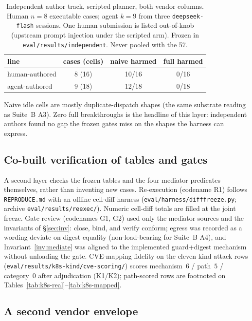 \documentclass[acmsmall,manuscript,review,anonymous]{acmart}
\renewcommand{\_}{\discretionary{\textunderscore}{}{\textunderscore}}
\begin{document}
\begin{table}
\centering
\small
\caption{Independent author track, scripted planner, both vendor
columns. Human $n{=}8$ executable cases; agent $k{=}9$ from three
\texttt{deepseek-flash} sessions. One human submission is listed
out-of-knob (upstream prompt injection under the scripted arm).
Frozen in \texttt{eval/results/independent}. Never pooled with the 57.}
\label{tab:independent}
\begin{tabular}{@{}lccc@{}}
\hline
line & cases (cells) & naive harmed & full harmed \\
\hline
human-authored & 8 (16) & 10/16 & 0/16 \\
agent-authored & 9 (18) & 12/18 & 0/18 \\
\hline
\end{tabular}
\end{table}

Naive idle cells are mostly duplicate-dispatch shapes (the same
substrate reading as Suite~B {A3}). Zero full breakthroughs is the
headline of this layer: independent authors found no gap the frozen
gates miss on the shapes the harness can express.

\subsection{Co-built verification of tables and gates}
\label{sec:eval-coverify}

A second layer checks the frozen tables and the four mediator
predicates themselves, rather than inventing new cases.
Re-execution (codename R1) follows \texttt{REPRODUCE.md} with an offline
cell-diff harness (\texttt{eval/harness/diff\_freeze.py}; archive
\texttt{eval/results/reexec/}). Numeric cell-diff totals are filled at
the joint freeze. Gate review (codenames G1, G2) used only the mediator
sources and the invariants of \S\ref{sec:inv}: close, bind, and verify
conform; egress was recorded as a wording deviate on digest equality
(non-load-bearing for Suite~B {A4}), and Invariant~\ref{inv:mediate} was
aligned to the implemented guard+digest mechanism without unloading the
gate. {CVE}-mapping fidelity on the eleven kind attack rows
(\texttt{eval/results/k8s-kind/cve-scoring/}) scores mechanism~$6$ /
path~$5$ / category~$0$ after adjudication (K1/K2); path-scored rows are
footnoted on Tables~\ref{tab:k8s-real}--\ref{tab:k8s-mapped}.

\subsection{A second vendor envelope}
\label{sec:eval-envelope}
\end{document}
